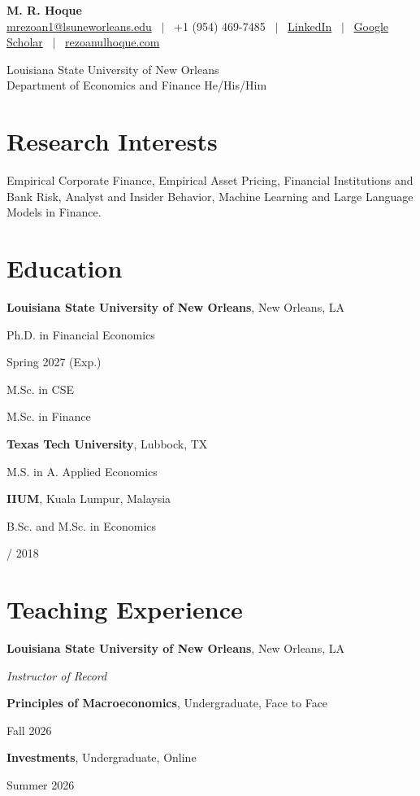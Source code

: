 \documentclass[11pt,letterpaper]{article}
\newcommand{\entry}[2]{%
  \noindent\begin{minipage}[t]{0.72\textwidth}\raggedright #1\end{minipage}%
  \hfill%
  \begin{minipage}[t]{0.27\textwidth}\raggedleft #2\end{minipage}\par
}
\newcommand{\hgap}{\par\vspace{3pt}}
\newcommand{\course}[4]{%
  \entry{\textbf{#1}, #2}{#3}\par\vspace{3pt}%
}
\newcommand{\smallgap}{\par\vspace{5pt}}
\begin{document}
\thispagestyle{empty}

\begin{center}
{\LARGE\bfseries M. R. Hoque}\\[6pt]
{\small
\href{mailto:mrezoan1@lsuneworleans.edu}{mrezoan1@lsuneworleans.edu} \ $\vert$ \
+1 (954) 469-7485 \ $\vert$ \
\href{https://www.linkedin.com/in/rezoanul/}{LinkedIn} \ $\vert$ \
\href{https://scholar.google.com/citations?user=I0jIEoQAAAAJ&hl=en}{Google Scholar} \ $\vert$ \
\href{https://rezoanulhoque.com/}{rezoanulhoque.com}}
\end{center}
\vspace{4pt}

Louisiana State University of New Orleans\\
Department of Economics and Finance \hfill He/His/Him

\section{Research Interests}
Empirical Corporate Finance, Empirical Asset Pricing, Financial Institutions and Bank Risk, Analyst and Insider Behavior, Machine Learning and Large Language Models in Finance.

\section{Education}

\textbf{Louisiana State University of New Orleans}, New Orleans, LA\hgap
\entry{Ph.D. in Financial Economics}{Spring 2027 (Exp.)}
\entry{M.Sc. in CSE}{2027}
\entry{M.Sc. in Finance}{2026}
\smallgap
\textbf{Texas Tech University}, Lubbock, TX\hgap
\entry{M.S. in A. Applied Economics}{2024}
\smallgap
\textbf{IIUM}, Kuala Lumpur, Malaysia\hgap
\entry{B.Sc. and M.Sc. in Economics}{2014 / 2018}

\section{Teaching Experience}

\entry{\textbf{Louisiana State University of New Orleans}, New Orleans, LA}{\textit{Instructor of Record}}
\hgap
\course{Principles of Macroeconomics}{Undergraduate, Face to Face}{Fall 2026}{course in progress}
\course{Investments}{Undergraduate, Online}{Summer 2026}{4.6/5.0}
\smallgap
\end{document}
